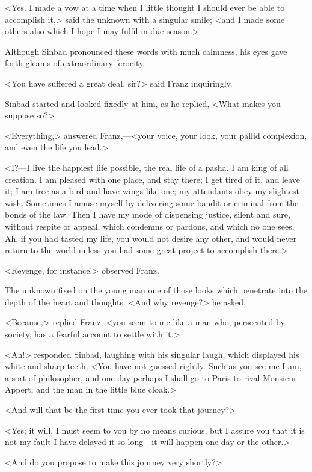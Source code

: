  <Yes. I made a vow at a time when I little thought I should ever be able to accomplish it,> said the unknown with a singular smile; <and I made some others also which I hope I may fulfil in due season.> 

 Although Sinbad pronounced these words with much calmness, his eyes gave forth gleams of extraordinary ferocity. 

 <You have suffered a great deal, sir?> said Franz inquiringly. 

 Sinbad started and looked fixedly at him, as he replied, <What makes you suppose so?> 

 <Everything,> answered Franz,—<your voice, your look, your pallid complexion, and even the life you lead.> 

 <I?—I live the happiest life possible, the real life of a pasha. I am king of all creation. I am pleased with one place, and stay there; I get tired of it, and leave it; I am free as a bird and have wings like one; my attendants obey my slightest wish. Sometimes I amuse myself by delivering some bandit or criminal from the bonds of the law. Then I have my mode of dispensing justice, silent and sure, without respite or appeal, which condemns or pardons, and which no one sees. Ah, if you had tasted my life, you would not desire any other, and would never return to the world unless you had some great project to accomplish there.> 

 <Revenge, for instance!> observed Franz. 

 The unknown fixed on the young man one of those looks which penetrate into the depth of the heart and thoughts. <And why revenge?> he asked. 

 <Because,> replied Franz, <you seem to me like a man who, persecuted by society, has a fearful account to settle with it.> 

 <Ah!> responded Sinbad, laughing with his singular laugh, which displayed his white and sharp teeth. <You have not guessed rightly. Such as you see me I am, a sort of philosopher, and one day perhaps I shall go to Paris to rival Monsieur Appert, and the man in the little blue cloak.> 

 <And will that be the first time you ever took that journey?> 

 <Yes; it will. I must seem to you by no means curious, but I assure you that it is not my fault I have delayed it so long—it will happen one day or the other.>

<And do you propose to make this journey very shortly?> 


